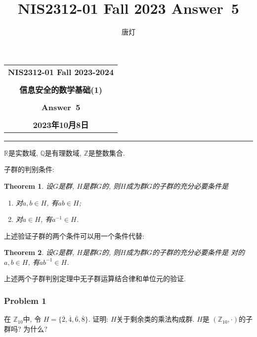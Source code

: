 \documentclass[a4paper,12pt]{ctexart}
\title{\title{NIS2312-01 Fall 2023 Answer~5}}
\author{唐灯}
\newcommand{\Z}{\mathbb{Z}}
\newcommand{\Q}{\mathbb{Q}}
\newcommand{\R}{\mathbb{R}}
\newtheorem{theorem}{Theorem}
\begin{document}
  \begin{center}

  \vspace{-0.3in}
  \begin{tabular}{c}
    \textbf{\Large NIS2312-01 Fall 2023-2024} \\
    \textbf{\Large  } \\
    \textbf{\Large  信息安全的数学基础(1)} \\
    \textbf{\Large  } \\
    \textbf{\Large  Answer~5} \\
    \textbf{\Large  } \\
    \textbf{\Large 2023年10月8日} \\
  \end{tabular}
  \end{center}
  \noindent
  \rule{\linewidth}{0.4pt}
  
$ \R $是实数域, $ \Q $是有理数域, $ \Z $是整数集合.

子群的判别条件: 
\begin{theorem}
    设$G$是群, $H$是群$G$的, 则$H$成为群$G$的子群的充分必要条件是
    \begin{enumerate}[label=(\arabic{*})]
        \item 对$a,b\in H$, 有$ab\in H$;
        \item 对$a\in H$, 有$a^{-1}\in H$. 
    \end{enumerate}
\end{theorem}

上述验证子群的两个条件可以用一个条件代替:
\begin{theorem}
    设$G$是群, $H$是群$G$的, 则$H$成为群$G$的子群的充分必要条件是 对的$a,b\in H$, 有$ab^{-1}\in H$.
\end{theorem}

上述两个子群判别定理中无子群运算结合律和单位元的验证. 

\subsubsection*{Problem 1}
  在 $ \Z_{10} $中, 令 $ H=\{\overline{2},\overline{4},\overline{6},\overline{8}\} $. 证明: $ H $关于剩余类的乘法构成群. $ H $是 $ (\Z_{10},\cdot) $的子群吗? 为什么?
      
\end{document}
